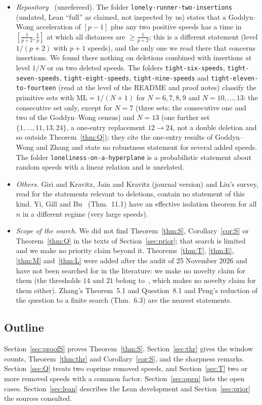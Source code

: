 \documentclass[11pt]{article}
\theoremstyle{definition}
\theoremstyle{remark}
\newcommand{\ML}{\mathrm{ML}}
\begin{document}
\begin{itemize}[nosep]
\item \emph{Repository}~\cite{R1337} (unrefereed). The folder \texttt{lonely-runner-two-insertions} (undated, Lean ``full'' as claimed, not inspected by us) states that a Goddyn--Wong acceleration of $[p-1]$ plus any two positive speeds has a time in $[\frac1{p+2},\frac1p]$ at which all distances are $\ge\frac1{p+2}$; this is a different statement (level $1/(p+2)$ with $p+1$ speeds), and the only one we read there that concerns insertions. We found there nothing on deletions combined with insertions at level $1/N$ or on two deleted speeds. The folders \texttt{tight-six-speeds}, \texttt{tight-seven-speeds}, \texttt{tight-eight-speeds}, \texttt{tight-nine-speeds} and \texttt{tight-eleven-to-fourteen} (read at the level of the README and proof notes) classify the primitive sets with $\ML=1/(N+1)$ for $N=6,7,8,9$ and $N=10,\dots,13$: the consecutive set only, except for $N=7$ (three sets: the consecutive one and two of the Goddyn--Wong census) and $N=13$ (one further set $\{1,\dots,11,13,24\}$, a one-entry replacement $12\to24$, not a double deletion and so outside Theorem~\ref{thm:Q}); they cite the one-entry results of Goddyn--Wong and Zhang and state no robustness statement for several added speeds. The folder \texttt{loneliness-on-a-hyperplane} is a probabilistic statement about random speeds with a linear relation and is unrelated.
\item \emph{Others.} Giri and Kravitz, Jain and Kravitz (journal version) and Liu's survey, read for the statements relevant to deletions, contain no statement of this kind. Yi, Gill and Bu~\cite{YGB} (Thm.~11.1) have an effective isolation theorem for all $n$ in a different regime (very large speeds).
\item \emph{Scope of the search.} We did not find Theorem~\ref{thm:S}, Corollary~\ref{cor:S} or Theorem~\ref{thm:Q} in the texts of Section~\ref{sec:prior}; that search is limited and we make no priority claim beyond it. Theorems~\ref{thm:T}, \ref{thm:E}, \ref{thm:M} and~\ref{thm:L} were added after the audit of 25 November 2026 and have not been searched for in the literature: we make no novelty claim for them (the thresholds $14$ and $21$ belong to~\cite{A1}, which makes no novelty claim for them either). Zhang's Theorem~5.1 and Question~8.1 and Peng's reduction of the question to a finite search (Thm.~6.3) are the nearest statements.
\end{itemize}

\subsection{Outline}
Section~\ref{sec:proofS} proves Theorem~\ref{thm:S}. Section~\ref{sec:thr} gives the window counts, Theorem~\ref{thm:thr} and Corollary~\ref{cor:S}, and the sharpness remarks. Section~\ref{sec:Q} treats two coprime removed speeds, and Section~\ref{sec:T} two or more removed speeds with a common factor. Section~\ref{sec:open} lists the open cases. Section~\ref{sec:lean} describes the Lean development and Section~\ref{sec:prior} the sources consulted.
\end{document}
